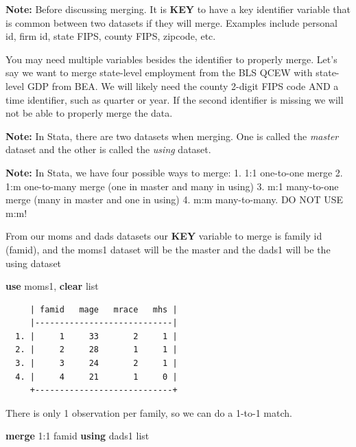 \documentclass[
]{book}
\newenvironment{Shaded}{\begin{snugshade}}{\end{snugshade}}
\newcommand{\KeywordTok}[1]{\textcolor[rgb]{0.13,0.29,0.53}{\textbf{#1}}}
\newcommand{\NormalTok}[1]{#1}
\newcommand{\OtherTok}[1]{\textcolor[rgb]{0.56,0.35,0.01}{#1}}
\begin{document}
\textbf{Note:} Before discussing merging. It is \textbf{KEY} to have a key identifier variable that is common between two datasets if they will merge. Examples include personal id, firm id, state FIPS, county FIPS, zipcode, etc.

You may need multiple variables besides the identifier to properly merge. Let's say we want to merge state-level employment from the BLS QCEW with state-level GDP from BEA. We will likely need the county 2-digit FIPS code AND a time identifier, such as quarter or year. If the second identifier is missing we will not be able to properly merge the data.

\textbf{Note:} In Stata, there are two datasets when merging. One is called the \emph{master}
dataset and the other is called the \emph{using} dataset.

\textbf{Note:} In Stata, we have four possible ways to merge:
1. 1:1 one-to-one merge
2. 1:m one-to-many merge (one in master and many in using)
3. m:1 many-to-one merge (many in master and one in using)
4. m:m many-to-many. DO NOT USE m:m!

From our moms and dads datasets our \textbf{KEY} variable to merge is family id (famid), and the moms1 dataset will be the master and the dads1 will be the using dataset

\begin{Shaded}
\begin{Highlighting}[]
\KeywordTok{use}\NormalTok{ moms1, }\KeywordTok{clear}
\OtherTok{list}
\end{Highlighting}
\end{Shaded}

\begin{verbatim}
     | famid   mage   mrace   mhs |
     |----------------------------|
  1. |     1     33       2     1 |
  2. |     2     28       1     1 |
  3. |     3     24       2     1 |
  4. |     4     21       1     0 |
     +----------------------------+
\end{verbatim}

There is only 1 observation per family, so we can do a 1-to-1 match.

\begin{Shaded}
\begin{Highlighting}[]
\KeywordTok{merge}\NormalTok{ 1:1 famid }\KeywordTok{using}\NormalTok{ dads1}
\OtherTok{list}
\end{Highlighting}
\end{Shaded}
\end{document}
